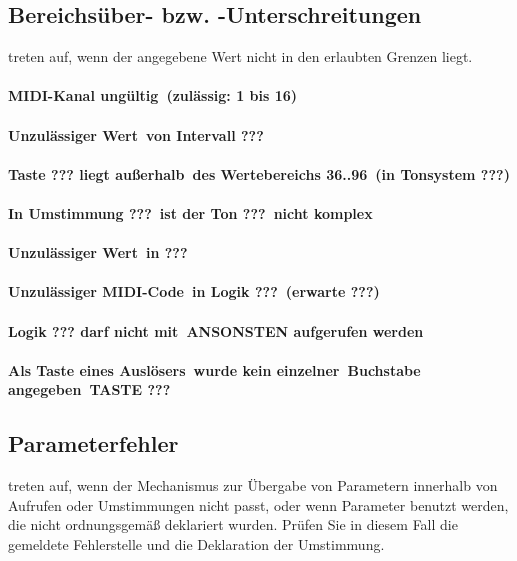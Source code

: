 \subsection{Bereichsüber- bzw. -Unterschreitungen}\label{sec:bere-bzw.-unterschr}
treten auf, wenn der angegebene Wert nicht in den
erlaubten Grenzen liegt.
\paragraph{MIDI-Kanal ungültig\ (zulässig: 1 bis 16)}
\paragraph{Unzulässiger Wert\ von Intervall ???}
\paragraph{Taste ??? liegt außerhalb\ des Wertebereichs 36..96\ (in Tonsystem ???)}
\paragraph{In Umstimmung ???\ ist der Ton ???\ nicht komplex}
\paragraph{Unzulässiger Wert\ in ???}
\paragraph{Unzulässiger MIDI-Code\ in Logik ???\ (erwarte ???)}
\paragraph{Logik ??? darf nicht mit\ ANSONSTEN aufgerufen werden}
\paragraph{Als Taste eines Auslösers\ wurde kein einzelner\ Buchstabe angegeben\ TASTE ???}
     
\subsection{Parameterfehler}\label{sec:parameterfehler}
treten auf, wenn der Mechanismus zur Übergabe von Parametern innerhalb
von Aufrufen oder Umstimmungen nicht passt, oder wenn Parameter
benutzt werden, die nicht ordnungsgemäß deklariert wurden. Prüfen Sie
in diesem Fall die gemeldete Fehlerstelle und die Deklaration der
Umstimmung.
